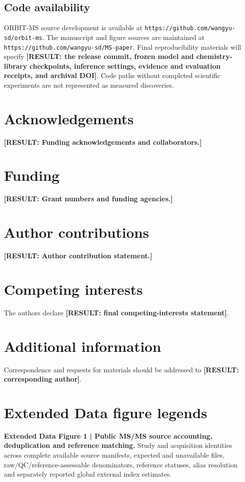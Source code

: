 \documentclass[11pt]{article}
\newcommand{\result}[1]{\textbf{\textcolor{orbitnavy}{[RESULT: #1]}}}
\begin{document}
\subsection*{Code availability}
ORBIT-MS source development is available at \texttt{https://github.com/wangyu-sd/orbit-ms}. The manuscript and figure sources are maintained at \texttt{https://github.com/wangyu-sd/MS-paper}. Final reproducibility materials will specify \result{the release commit, frozen model and chemistry-library checkpoints, inference settings, evidence and evaluation receipts, and archival DOI}. Code paths without completed scientific experiments are not represented as measured discoveries.

\section*{Acknowledgements}
\result{Funding acknowledgements and collaborators.}

\section*{Funding}
\result{Grant numbers and funding agencies.}

\section*{Author contributions}
\result{Author contribution statement.}

\section*{Competing interests}
The authors declare \result{final competing-interests statement}.

\section*{Additional information}
Correspondence and requests for materials should be addressed to \result{corresponding author}.




\section*{Extended Data figure legends}

\noindent\textbf{Extended Data Figure 1 | Public MS/MS source accounting, deduplication and reference matching.}
Study and acquisition identities across complete available source manifests, expected and unavailable files, raw/QC/reference-assessable denominators, reference statuses, alias resolution and separately reported global external index estimates.
\end{document}
